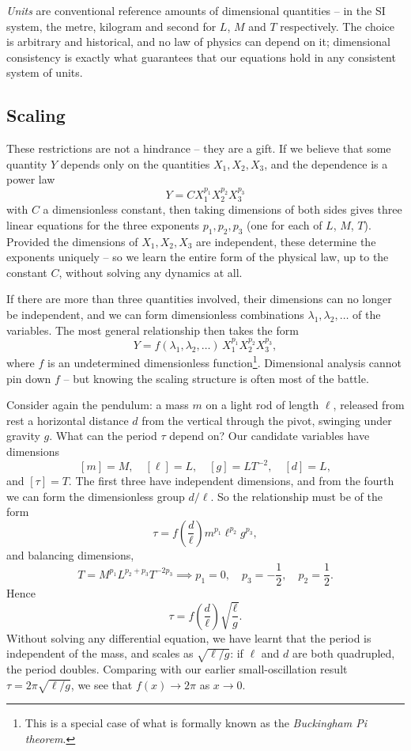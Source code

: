 \documentclass[a4paper]{scrartcl}
\begin{document}
\emph{Units} are conventional reference amounts of dimensional quantities -- in the SI system, the metre, kilogram and second for $L$, $M$ and $T$ respectively. The choice is arbitrary and historical, and no law of physics can depend on it; dimensional consistency is exactly what guarantees that our equations hold in any consistent system of units.

\subsection{Scaling}

These restrictions are not a hindrance -- they are a gift. If we believe that some quantity $Y$ depends only on the quantities $X_1, X_2, X_3$, and the dependence is a power law
$$
Y = C X_1^{p_1} X_2^{p_2} X_3^{p_3}
$$
with $C$ a dimensionless constant, then taking dimensions of both sides gives three linear equations for the three exponents $p_1, p_2, p_3$ (one for each of $L$, $M$, $T$). Provided the dimensions of $X_1, X_2, X_3$ are independent, these determine the exponents uniquely -- so we learn the entire form of the physical law, up to the constant $C$, without solving any dynamics at all.

If there are more than three quantities involved, their dimensions can no longer be independent, and we can form dimensionless combinations $\lambda_1, \lambda_2, \dots$ of the variables. The most general relationship then takes the form
$$
Y = f(\lambda_1, \lambda_2, \dots)\, X_1^{p_1} X_2^{p_2} X_3^{p_3},
$$
where $f$ is an undetermined dimensionless function\footnote{This is a special case of what is formally known as the \emph{Buckingham Pi theorem}.}. Dimensional analysis cannot pin down $f$ -- but knowing the scaling structure is often most of the battle.

\begin{example}
	Consider again the pendulum: a mass $m$ on a light rod of length $\ell$, released from rest a horizontal distance $d$ from the vertical through the pivot, swinging under gravity $g$. What can the period $\tau$ depend on? Our candidate variables have dimensions
	$$
	[m] = M, \quad [\ell] = L, \quad [g] = LT^{-2}, \quad [d] = L,
	$$
	and $[\tau] = T$. The first three have independent dimensions, and from the fourth we can form the dimensionless group $d/\ell$. So the relationship must be of the form
	$$
	\tau = f\left(\frac{d}{\ell}\right) m^{p_1} \ell^{p_2} g^{p_3},
	$$
	and balancing dimensions,
	$$
	T = M^{p_1} L^{p_2 + p_3} T^{-2p_3} \implies p_1 = 0, \quad p_3 = -\frac{1}{2}, \quad p_2 = \frac{1}{2}.
	$$
	Hence
	$$
	\tau = f\left(\frac{d}{\ell}\right)\sqrt{\frac{\ell}{g}}.
	$$
	Without solving any differential equation, we have learnt that the period is independent of the mass, and scales as $\sqrt{\ell/g}$: if $\ell$ and $d$ are both quadrupled, the period doubles. Comparing with our earlier small-oscillation result $\tau = 2\pi\sqrt{\ell/g}$, we see that $f(x) \to 2\pi$ as $x \to 0$.
\end{example}
\end{document}
